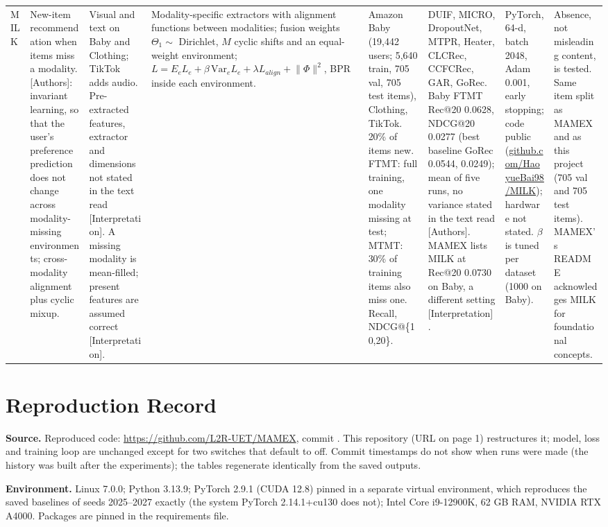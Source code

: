 \documentclass[conference]{IEEEtran}
\newcommand{\code}[1]{\texttt{\detokenize{#1}}}
\begin{document}
\begin{longtable}{@{}p{1.7cm}*{7}{>{\raggedright\arraybackslash}p{2.0cm}}@{}}
\midrule
MILK~\cite{bai2024milk} & New-item recommendation when items miss a modality. [Authors]: invariant learning, so that the user's preference prediction does not change across modality-missing environments; cross-modality alignment plus cyclic mixup. & Visual and text on Baby and Clothing; TikTok adds audio. Pre-extracted features, extractor and dimensions not stated in the text read [Interpretation]. A missing modality is mean-filled; present features are assumed correct [Interpretation]. & Modality-specific extractors with alignment functions between modalities; fusion weights $\Theta_1\sim$ Dirichlet, $M$ cyclic shifts and an equal-weight environment; $L = E_e L_e + \beta\,\mathrm{Var}_e L_e + \lambda L_{align} + \lVert\Phi\rVert^2$, BPR inside each environment. & Amazon Baby (19,442 users; 5,640 train, 705 val, 705 test items), Clothing, TikTok. 20\% of items new. FTMT: full training, one modality missing at test; MTMT: 30\% of training items also miss one. Recall, NDCG@\{10,20\}. & DUIF, MICRO, DropoutNet, MTPR, Heater, CLCRec, CCFCRec, GAR, GoRec. Baby FTMT Rec@20 0.0628, NDCG@20 0.0277 (best baseline GoRec 0.0544, 0.0249); mean of five runs, no variance stated in the text read [Authors]. MAMEX lists MILK at Rec@20 0.0730 on Baby, a different setting [Interpretation]. & PyTorch, 64-d, batch 2048, Adam 0.001, early stopping; code public (\url{github.com/HaoyueBai98/MILK}); hardware not stated. $\beta$ is tuned per dataset (1000 on Baby). & Absence, not misleading content, is tested. Same item split as MAMEX and as this project (705 val and 705 test items). MAMEX's README acknowledges MILK for foundational concepts. \\
\end{longtable}
\endgroup
\twocolumn

\section{Reproduction Record}
\label{app:record}

\textbf{Source.} Reproduced code: \url{https://github.com/L2R-UET/MAMEX}, commit \code{88a932eca821a5657b2b7fc0b6445e4685f4dfab}. This repository (URL on page 1) restructures it; model, loss and training loop are unchanged except for two switches that default to off. Commit timestamps do not show when runs were made (the history was built after the experiments); the tables regenerate identically from the saved outputs.

\textbf{Environment.} Linux 7.0.0; Python 3.13.9; PyTorch 2.9.1 (CUDA 12.8) pinned in a separate virtual environment, which reproduces the saved baselines of seeds 2025--2027 exactly (the system PyTorch 2.14.1+cu130 does not); Intel Core i9-12900K, 62 GB RAM, NVIDIA RTX A4000. Packages are pinned in the requirements file.
\end{document}
